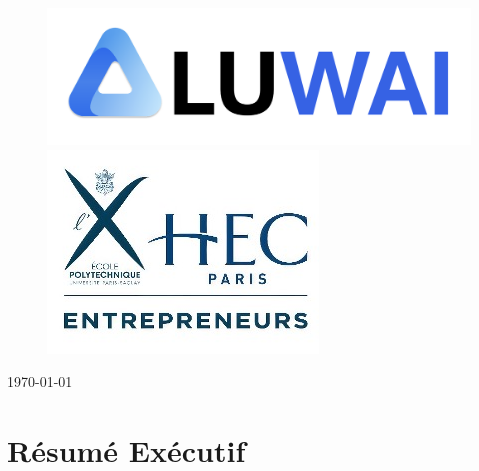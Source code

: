 \documentclass[12pt,a4paper]{report}
\numberwithin{figure}{chapter}
\numberwithin{table}{chapter}
\begin{document}
\begin{titlepage}
\begin{center}
\begin{figure}[H]
    \centering
    \begin{minipage}{0.35\textwidth}
        \centering
        \includegraphics[width=\linewidth]{images/logo.png}
    \end{minipage}\hfill
    \begin{minipage}{0.40\textwidth}
        \centering
        \includegraphics[width=\linewidth]{"images/X-HEC image.jpg"}
    \end{minipage}
\end{figure}

\vfill

{\large \today}

\end{center}
\end{titlepage}

\setcounter{page}{1}

\chapter*{Résumé Exécutif}
\end{document}
